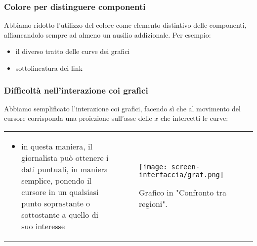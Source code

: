 \begin{frame}
    \frametitle{Colore per distinguere componenti}
    \label{f:colore}
    Abbiamo ridotto l'utilizzo del colore come elemento distintivo delle componenti, affiancandolo sempre ad almeno un ausilio addizionale. Per esempio:
    \begin{itemize}
        \item il diverso tratto delle curve dei grafici
        \item sottolineatura dei link
    \end{itemize}
\end{frame}

\begin{frame}
    \frametitle{Difficoltà nell'interazione coi grafici}
    \label{f:difficolta}
    Abbiamo semplificato l'interazione coi grafici, facendo sì che al movimento del cursore corrisponda una proiezione sull'asse delle $x$ che intercetti le curve: 
    \begin{tabular}{p{}p{}}    
        \begin{itemize}
            \item in questa maniera, il giornalista può ottenere i dati puntuali, in maniera semplice, ponendo il cursore in un qualsiasi punto soprastante o sottostante a quello di suo interesse
        \end{itemize} &
            
        \begin{figure}
            \centering
            \texttt{[image: screen-interfaccia/graf.png]}
            \caption{Grafico in "Confronto tra regioni".} 
        \end{figure}  \\
    \end{tabular}   
\end{frame}
